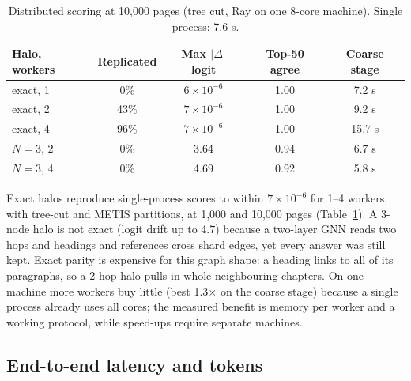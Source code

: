 \documentclass[11pt]{article}
\begin{document}
\begin{table}[t]
\centering
\scriptsize
\setlength{\tabcolsep}{3pt}
\begin{tabular}{@{}lcccc@{}}
\toprule
\textbf{Halo, workers} & \textbf{Replicated} & \textbf{Max $|\Delta|$ logit} & \textbf{Top-50 agree} & \textbf{Coarse stage} \\
\midrule
exact, 1 & 0\% & $6\times10^{-6}$ & 1.00 & 7.2 s \\
exact, 2 & 43\% & $7\times10^{-6}$ & 1.00 & 9.2 s \\
exact, 4 & 96\% & $7\times10^{-6}$ & 1.00 & 15.7 s \\
$N{=}3$, 2 & 0\% & 3.64 & 0.94 & 6.7 s \\
$N{=}3$, 4 & 0\% & 4.69 & 0.92 & 5.8 s \\
\bottomrule
\end{tabular}
\caption{Distributed scoring at 10,000 pages (tree cut, Ray on one 8-core machine). Single process: 7.6 s.}
\label{tab:distributed}
\end{table}

Exact halos reproduce single-process scores to within $7\times10^{-6}$ for 1--4 workers, with tree-cut and METIS partitions, at 1,000 and 10,000 pages (Table~\ref{tab:distributed}). A 3-node halo is not exact (logit drift up to 4.7) because a two-layer GNN reads two hops and headings and references cross shard edges, yet every answer was still kept. Exact parity is expensive for this graph shape: a heading links to all of its paragraphs, so a 2-hop halo pulls in whole neighbouring chapters. On one machine more workers buy little (best 1.3$\times$ on the coarse stage) because a single process already uses all cores; the measured benefit is memory per worker and a working protocol, while speed-ups require separate machines.

\subsection{End-to-end latency and tokens}
\end{document}
